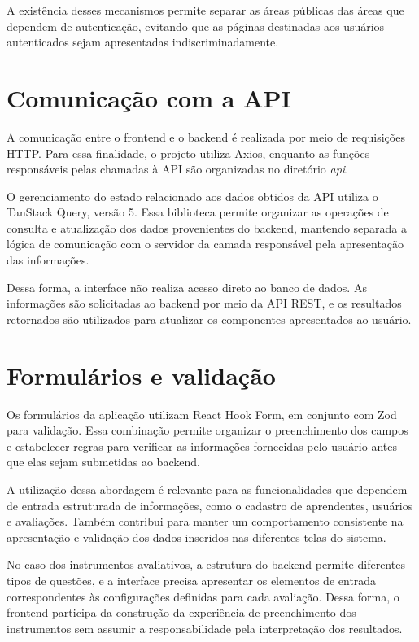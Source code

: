 A existência desses mecanismos permite separar as áreas públicas das áreas que dependem de autenticação, evitando que as páginas destinadas aos usuários autenticados sejam apresentadas indiscriminadamente.

\section{Comunicação com a API}

A comunicação entre o frontend e o backend é realizada por meio de requisições HTTP. Para essa finalidade, o projeto utiliza Axios, enquanto as funções responsáveis pelas chamadas à API são organizadas no diretório \textit{api}.

O gerenciamento do estado relacionado aos dados obtidos da API utiliza o TanStack Query, versão 5. Essa biblioteca permite organizar as operações de consulta e atualização dos dados provenientes do backend, mantendo separada a lógica de comunicação com o servidor da camada responsável pela apresentação das informações.

Dessa forma, a interface não realiza acesso direto ao banco de dados. As informações são solicitadas ao backend por meio da API REST, e os resultados retornados são utilizados para atualizar os componentes apresentados ao usuário.

\section{Formulários e validação}

Os formulários da aplicação utilizam React Hook Form, em conjunto com Zod para validação. Essa combinação permite organizar o preenchimento dos campos e estabelecer regras para verificar as informações fornecidas pelo usuário antes que elas sejam submetidas ao backend.

A utilização dessa abordagem é relevante para as funcionalidades que dependem de entrada estruturada de informações, como o cadastro de aprendentes, usuários e avaliações. Também contribui para manter um comportamento consistente na apresentação e validação dos dados inseridos nas diferentes telas do sistema.

No caso dos instrumentos avaliativos, a estrutura do backend permite diferentes tipos de questões, e a interface precisa apresentar os elementos de entrada correspondentes às configurações definidas para cada avaliação. Dessa forma, o frontend participa da construção da experiência de preenchimento dos instrumentos sem assumir a responsabilidade pela interpretação dos resultados.

